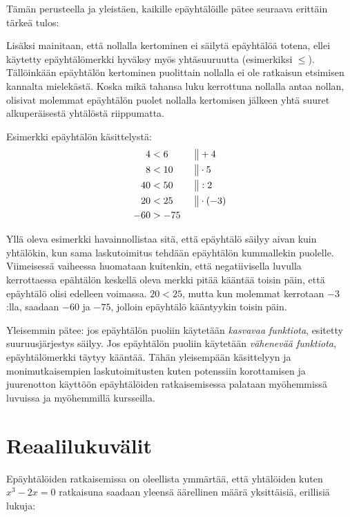 Tämän perusteella ja yleistäen, kaikille epäyhtälöille pätee seuraava erittäin tärkeä tulos:


Lisäksi mainitaan, että nollalla kertominen ei säilytä epäyhtälöä totena, ellei käytetty epäyhtälömerkki hyväksy myös yhtäsuuruutta (esimerkiksi $\leq$). Tällöinkään epäyhtälön kertominen puolittain nollalla ei ole ratkaisun etsimisen kannalta mielekästä. Koska mikä tahansa luku kerrottuna nollalla antaa nollan, olisivat molemmat epäyhtälön puolet nollalla kertomisen jälkeen yhtä suuret alkuperäisestä yhtälöstä riippumatta.

\begin{esimerkki}

Esimerkki epäyhtälön käsittelystä:
\begin{align*}
4&<6  \ \ \ \ \ &&\big\| +4 \\
8&<10 &&\big\| \cdot 5 \\
40&<50 &&\big\| :2 \\
20&<25 &&\big\| \cdot (-3) \\
-60&>-75
\end{align*}
\end{esimerkki}

Yllä oleva esimerkki havainnollistaa sitä, että epäyhtälö säilyy aivan kuin
yhtälökin, kun sama laskutoimitus tehdään epäyhtälön kummallekin puolelle.
Viimeisessä vaiheessa huomataan kuitenkin, että negatiivisella luvulla
kerrottaessa epähtälön keskellä oleva merkki pitää kääntää toisin päin, että
epäyhtälö olisi edelleen voimassa. $20<25$, mutta kun molemmat kerrotaan
$-3$:lla, saadaan $-60$ ja $-75$, jolloin epäyhtälö kääntyykin toisin päin.

Yleisemmin pätee: jos epäyhtälön puoliin käytetään \emph{kasvavaa funktiota}, esitetty suuruusjärjestys säilyy. Jos epäyhtälön puoliin käytetään \emph{vähenevää funktiota}, epäyhtälömerkki täytyy kääntää. Tähän yleisempään käsittelyyn ja monimutkaisempien laskutoimitusten kuten potenssiin korottamisen ja juurenotton käyttöön epäyhtälöiden ratkaisemisessa palataan myöhemmissä luvuissa ja myöhemmillä kursseilla.

\section{Reaalilukuvälit}

Epäyhtälöiden ratkaisemissa on oleellista ymmärtää, että yhtälöiden kuten $x^3-2x=0$ ratkaisuna saadaan yleensä äärellinen määrä yksittäisiä, erillisiä lukuja:

